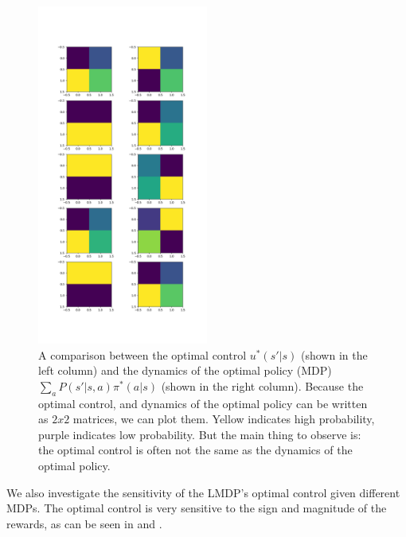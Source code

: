 \begin{figure}
\centering
\includegraphics[width=0.5\textwidth,height=0.75\textheight]{../../pictures/figures/lmdp_mdp_optimal_dynamics.png}
\caption{A comparison between the optimal control $u^{* }(s'|s)$ (shown in the left column) and the dynamics of the optimal policy (MDP) $\sum_a P(s'|s, a)\pi^{* }(a|s)$ (shown in the right column). Because the optimal control, and dynamics of the optimal policy can be written as $2x2$ matrices, we can plot them. Yellow indicates high probability, purple indicates low probability. But the main thing to observe is: the optimal control is often not the same as the dynamics of the optimal policy.}
\label{fig:opt-control}
\end{figure}

We also investigate the sensitivity of the LMDP's optimal control given different MDPs.
The optimal control is very sensitive to the sign and magnitude of the rewards, as can be seen in \label{fig:chain-zero} and \label{fig:chain-pos}.

